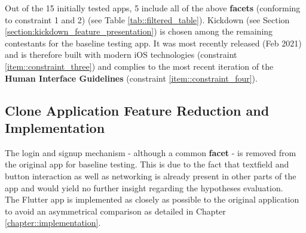 Out of the 15 initially tested apps, 5 include all of the above \textbf{facets} (conforming to
constraint 1 and 2) (see Table \ref{tab::filtered_table}). Kickdown (see Section \ref{section:kickdown_feature_presentation}) is chosen among the remaining 
contestants for the baseline testing app. It was most recently released (Feb 2021) and is therefore built with modern iOS technologies (constraint \ref{item::constraint_three})
and complies to the most recent iteration of the \textbf{Human Interface Guidelines} (constraint \ref{item::constraint_four}).

\subsection{Clone Application Feature Reduction and Implementation} \label{subsection::clone_app_feature_reduction}
The login and signup mechanism - although a common \textbf{facet} - is removed from the original
app for baseline testing. This is due to the fact that textfield and button interaction as well
as networking is already present in other parts of the app and would yield no further insight
regarding the hypotheses evaluation.\\
The Flutter app is implemented as closely as possible to the original application to avoid an
asymmetrical comparison as detailed in Chapter \ref{chapter::implementation}.


